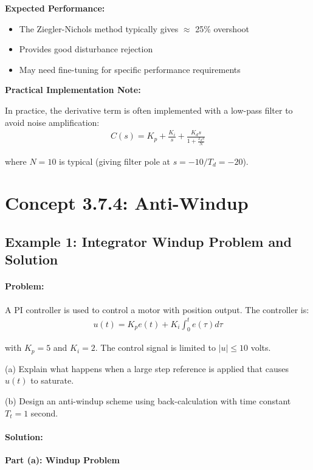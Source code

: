 \documentclass[11pt,a4paper]{article}
\begin{document}
\textbf{Expected Performance:}
\begin{itemize}
\item The Ziegler-Nichols method typically gives $\approx$ 25\% overshoot
\item Provides good disturbance rejection
\item May need fine-tuning for specific performance requirements
\end{itemize}

\textbf{Practical Implementation Note:}

In practice, the derivative term is often implemented with a low-pass filter to avoid noise amplification:
\begin{align}
C(s) = K_p + \frac{K_i}{s} + \frac{K_d s}{1 + \frac{T_d s}{N}}
\end{align}

where $N = 10$ is typical (giving filter pole at $s = -10/T_d = -20$).

\section{Concept 3.7.4: Anti-Windup}

\subsection{Example 1: Integrator Windup Problem and Solution}

\paragraph{Problem:} A PI controller is used to control a motor with position output. The controller is:
\begin{align}
u(t) = K_p e(t) + K_i \int_0^t e(\tau) d\tau
\end{align}

with $K_p = 5$ and $K_i = 2$. The control signal is limited to $|u| \leq 10$ volts.

(a) Explain what happens when a large step reference is applied that causes $u(t)$ to saturate.

(b) Design an anti-windup scheme using back-calculation with time constant $T_t = 1$ second.

\paragraph{Solution:}

\textbf{Part (a): Windup Problem}
\end{document}

